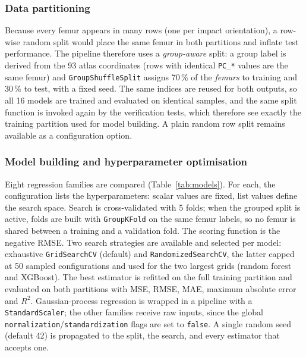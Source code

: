 \subsubsection{Data partitioning}
\label{sec:methods:split}

Because every femur appears in many rows (one per impact orientation), a
row-wise random split would place the same femur in both partitions and
inflate test performance. The pipeline therefore uses a \emph{group-aware}
split: a group label is derived from the 93 atlas coordinates (rows with
identical \texttt{PC\_*} values are the same femur) and
\texttt{GroupShuffleSplit} assigns 70\,\% of the \emph{femurs} to training
and 30\,\% to test, with a fixed seed. The same indices are reused for both
outputs, so all 16 models are trained and evaluated on identical samples, and
the same split function is invoked again by the verification tests, which
therefore see exactly the training partition used for model building. A
plain random row split remains available as a configuration option.

\subsubsection{Model building and hyperparameter optimisation}
\label{sec:methods:training}

Eight regression families are compared (Table~\ref{tab:models}). For each,
the configuration lists the hyperparameters: scalar values are fixed, list
values define the search space. Search is cross-validated with 5 folds; when
the grouped split is active, folds are built with \texttt{GroupKFold} on the
same femur labels, so no femur is shared between a training and a validation
fold. The scoring function is the negative RMSE. Two search strategies are
available and selected per model: exhaustive \texttt{GridSearchCV} (default)
and \texttt{RandomizedSearchCV}, the latter capped at 50 sampled
configurations and used for the two largest grids (random forest and
XGBoost). The best estimator is refitted on the full training partition and
evaluated on both partitions with MSE, RMSE, MAE, maximum absolute error and
$R^2$. Gaussian-process regression is wrapped in a pipeline with a
\texttt{StandardScaler}; the other families receive raw inputs, since the
global \texttt{normalization}/\texttt{standardization} flags are set to
\texttt{false}. A single random seed (default 42) is propagated to the split,
the search, and every estimator that accepts one.

